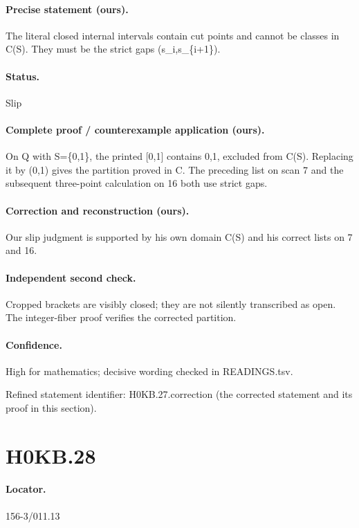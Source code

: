 \paragraph{Precise statement (ours).} The literal closed internal intervals contain cut points and cannot be classes in C(S). They must be the strict gaps (s\_i,s\_\{i+1\}).

\paragraph{Status.} Slip

\paragraph{Complete proof / counterexample application (ours).} On Q with S=\{0,1\}, the printed [0,1] contains 0,1, excluded from C(S). Replacing it by (0,1) gives the partition proved in C. The preceding list on scan 7 and the subsequent three-point calculation on 16 both use strict gaps.

\paragraph{Correction and reconstruction (ours).} Our slip judgment is supported by his own domain C(S) and his correct lists on 7 and 16.

\paragraph{Independent second check.} Cropped brackets are visibly closed; they are not silently transcribed as open. The integer-fiber proof verifies the corrected partition.

\paragraph{Confidence.} High for mathematics; decisive wording checked in READINGS.tsv.

\noindent Refined statement identifier: H0KB.27.correction (the corrected statement and its proof in this section).

\section*{H0KB.28}\label{statement:H0KB.28}
\paragraph{Locator.} 156-3/011.13

